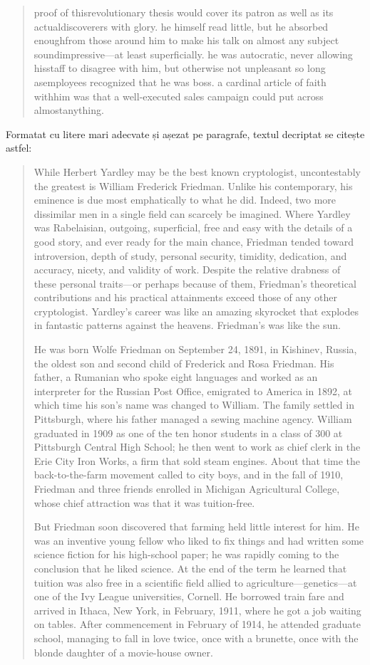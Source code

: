\documentclass{labreport}
\begin{document}
\begin{quote}
proof of thisrevolutionary thesis would cover its patron as well as its actualdiscoverers with glory. he himself read little, but he absorbed enoughfrom those around him to make his talk on almost any subject soundimpressive---at least superficially. he was autocratic, never allowing hisstaff to disagree with him, but otherwise not unpleasant so long asemployees recognized that he was boss. a cardinal article of faith withhim was that a well-executed sales campaign could put across almostanything.
\end{quote}

Formatat cu litere mari adecvate și așezat pe paragrafe, textul decriptat se citește astfel:

\begin{quote}\small\raggedright
While Herbert Yardley may be the best known cryptologist, uncontestably the greatest is William Frederick Friedman. Unlike his contemporary, his eminence is due most emphatically to what he did. Indeed, two more dissimilar men in a single field can scarcely be imagined. Where Yardley was Rabelaisian, outgoing, superficial, free and easy with the details of a good story, and ever ready for the main chance, Friedman tended toward introversion, depth of study, personal security, timidity, dedication, and accuracy, nicety, and validity of work. Despite the relative drabness of these personal traits---or perhaps because of them, Friedman's theoretical contributions and his practical attainments exceed those of any other cryptologist. Yardley's career was like an amazing skyrocket that explodes in fantastic patterns against the heavens. Friedman's was like the sun.

He was born Wolfe Friedman on September 24, 1891, in Kishinev, Russia, the oldest son and second child of Frederick and Rosa Friedman. His father, a Rumanian who spoke eight languages and worked as an interpreter for the Russian Post Office, emigrated to America in 1892, at which time his son's name was changed to William. The family settled in Pittsburgh, where his father managed a sewing machine agency. William graduated in 1909 as one of the ten honor students in a class of 300 at Pittsburgh Central High School; he then went to work as chief clerk in the Erie City Iron Works, a firm that sold steam engines. About that time the back-to-the-farm movement called to city boys, and in the fall of 1910, Friedman and three friends enrolled in Michigan Agricultural College, whose chief attraction was that it was tuition-free.

But Friedman soon discovered that farming held little interest for him. He was an inventive young fellow who liked to fix things and had written some science fiction for his high-school paper; he was rapidly coming to the conclusion that he liked science. At the end of the term he learned that tuition was also free in a scientific field allied to agriculture---genetics---at one of the Ivy League universities, Cornell. He borrowed train fare and arrived in Ithaca, New York, in February, 1911, where he got a job waiting on tables. After commencement in February of 1914, he attended graduate school, managing to fall in love twice, once with a brunette, once with the blonde daughter of a movie-house owner.


\end{quote}
\end{document}
